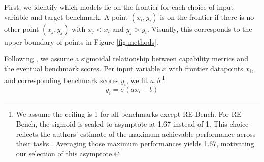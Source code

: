 First, we identify which models lie on the frontier for each choice of input variable and target benchmark. A point \((x_i, y_i)\) is on the frontier if there is no other point \((x_j, y_j)\) with \(x_j < x_i\) and \(y_j > y_i\). Visually, this corresponds to the upper boundary of points in Figure  \ref{fig:methods}.


Following \citet{ruan2024observational}, we assume a sigmoidal relationship between capability metrics and the eventual benchmark scores. 
Per input variable $x$ with frontier datapoints $x_i$, and corresponding benchmark scores $y_i$, we fit $a, b$.\footnote{We assume the ceiling is 1 for all benchmarks except RE-Bench. For RE-Bench, the sigmoid is scaled to asymptote at 1.67 instead of 1. This choice reflects the authors' estimate of the maximum achievable performance across their tasks  \cite{wijk2024rebenchevaluatingfrontierai}. Averaging those maximum performances yields 1.67, motivating our selection of this asymptote.}
\begin{equation}\label{eq:sigmoid}
    y_i = \sigma(a x_i + b)
\end{equation}


